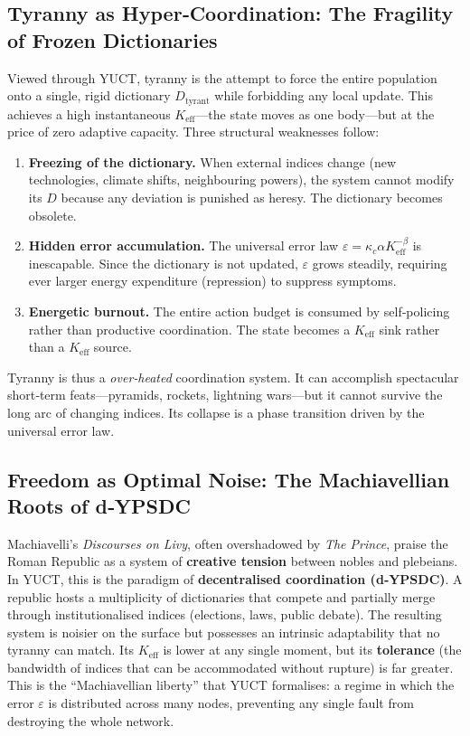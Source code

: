 \documentclass[12pt,a4paper]{article}
\newcommand{\Keff}{K_{\mathrm{eff}}}
\begin{document}
	\subsection{Tyranny as Hyper‑Coordination: The Fragility of Frozen Dictionaries}
	
	Viewed through YUCT, tyranny is the attempt to force the entire population onto a single, rigid dictionary \(D_{\text{tyrant}}\) while forbidding any local update. This achieves a high instantaneous \(\Keff\)---the state moves as one body---but at the price of zero adaptive capacity. Three structural weaknesses follow:
	
	\begin{enumerate}[leftmargin=*]
		\item \textbf{Freezing of the dictionary.} When external indices change (new technologies, climate shifts, neighbouring powers), the system cannot modify its \(D\) because any deviation is punished as heresy. The dictionary becomes obsolete.
		\item \textbf{Hidden error accumulation.} The universal error law \(\varepsilon = \kappa_c \alpha \Keff^{-\beta}\) is inescapable. Since the dictionary is not updated, \(\varepsilon\) grows steadily, requiring ever larger energy expenditure (repression) to suppress symptoms.
		\item \textbf{Energetic burnout.} The entire action budget is consumed by self‑policing rather than productive coordination. The state becomes a \(K_{\mathrm{eff}}\) sink rather than a \(K_{\mathrm{eff}}\) source.
	\end{enumerate}
	
	Tyranny is thus a \emph{over‑heated} coordination system. It can accomplish spectacular short‑term feats---pyramids, rockets, lightning wars---but it cannot survive the long arc of changing indices. Its collapse is a phase transition driven by the universal error law.
	
	\subsection{Freedom as Optimal Noise: The Machiavellian Roots of d‑YPSDC}
	
	Machiavelli’s \emph{Discourses on Livy}, often overshadowed by \emph{The Prince}, praise the Roman Republic as a system of \textbf{creative tension} between nobles and plebeians. In YUCT, this is the paradigm of \textbf{decentralised coordination (d‑YPSDC)}. A republic hosts a multiplicity of dictionaries that compete and partially merge through institutionalised indices (elections, laws, public debate). The resulting system is noisier on the surface but possesses an intrinsic adaptability that no tyranny can match. Its \(\Keff\) is lower at any single moment, but its \textbf{tolerance} (the bandwidth of indices that can be accommodated without rupture) is far greater. This is the ``Machiavellian liberty'' that YUCT formalises: a regime in which the error \(\varepsilon\) is distributed across many nodes, preventing any single fault from destroying the whole network.
	
\end{document}
